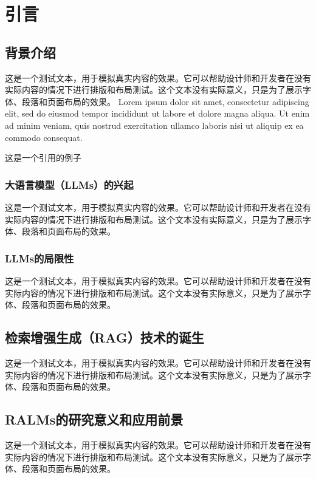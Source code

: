 \chapter{引\hspace{6pt}言}

\section{背景介绍}

这是一个测试文本，用于模拟真实内容的效果。它可以帮助设计师和开发者在没有实际内容的情况下进行排版和布局测试。这个文本没有实际意义，只是为了展示字体、段落和页面布局的效果。
Lorem ipsum dolor sit amet, consectetur adipiscing elit, sed do eiusmod tempor incididunt ut labore et dolore magna aliqua. Ut enim ad minim veniam, quis nostrud exercitation ullamco laboris nisi ut aliquip ex ea commodo consequat.

这是一个引用的例子~\cite{
    Yao2024, 
    Fan2024, 
    Yang2024,
    Posedaru2024, 
    Wiratunga2024, 
    ke2024developmenttestingretrievalaugmented, 
    li2024enhancingllmfactualaccuracy, 
    Daneshvar2024, 
    He2024,
    siriwardhana2022improvingdomainadaptationretrieval, 
    Miao2024, 
    Zhang2024, 
    li2024laragenhancingllmbasedasraccuracy, 
    Wu2024,
    wang2024llmsknowneedleveraging, 
    Kuppa2024,
    https://doi.org/10.1111/liv.15974, 
    hu2024promptperturbationretrievalaugmentedgeneration, 
    hu2024ragrausurveyretrievalaugmented,
    destefano2024ragrollendtoendevaluation,
    Phan2024,
    Zhao2024,
    li2024retrievalaugmentedgenerationlongcontext,
    Lewis2020,
    Xu2024,
    Ahn2022,
    Zhang2023,
    Glass1949,
    Chan2024,
    Laban2024,
    Fatehkia2024,
    Yilma2024,
    Zeng2024,
    Cuconasu2024,
    Cheng2024,
    Nam2024,
    Kreimeyer2024,
    du2024vulragenhancingllmbasedvulnerability,
    WOS:000452649406008,
    guu2020realmretrievalaugmentedlanguagemodel,
    WOS:000900116904035
    }

\subsection{大语言模型（LLMs）的兴起}
这是一个测试文本，用于模拟真实内容的效果。它可以帮助设计师和开发者在没有实际内容的情况下进行排版和布局测试。这个文本没有实际意义，只是为了展示字体、段落和页面布局的效果。

\subsection{LLMs的局限性}
这是一个测试文本，用于模拟真实内容的效果。它可以帮助设计师和开发者在没有实际内容的情况下进行排版和布局测试。这个文本没有实际意义，只是为了展示字体、段落和页面布局的效果。

\section{检索增强生成（RAG）技术的诞生}
这是一个测试文本，用于模拟真实内容的效果。它可以帮助设计师和开发者在没有实际内容的情况下进行排版和布局测试。这个文本没有实际意义，只是为了展示字体、段落和页面布局的效果。

\section{RALMs的研究意义和应用前景}
这是一个测试文本，用于模拟真实内容的效果。它可以帮助设计师和开发者在没有实际内容的情况下进行排版和布局测试。这个文本没有实际意义，只是为了展示字体、段落和页面布局的效果。
